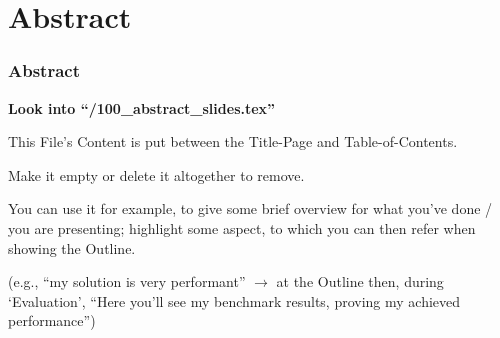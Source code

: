 
\section*{Abstract}

\begin{frame}[plain]
\frametitle{Abstract}
	\textcolor{green!60!orange}{\bfseries Look into ``\DenKrSegmentationSubDir/100\_abstract\_slides.tex''}\par
	This File's Content is put between the Title-Page and Table-of-Contents.

	Make it empty or delete it altogether to remove.

	You can use it for example, to give some brief overview for what you've done / you are presenting; highlight some aspect, to which you can then refer when showing the Outline.

	(e.g., \enquote{my solution is very performant} $\rightarrow$ at the Outline then, during \enquote*{Evaluation}, \enquote{Here you'll see my benchmark results, proving my achieved performance})
\end{frame}